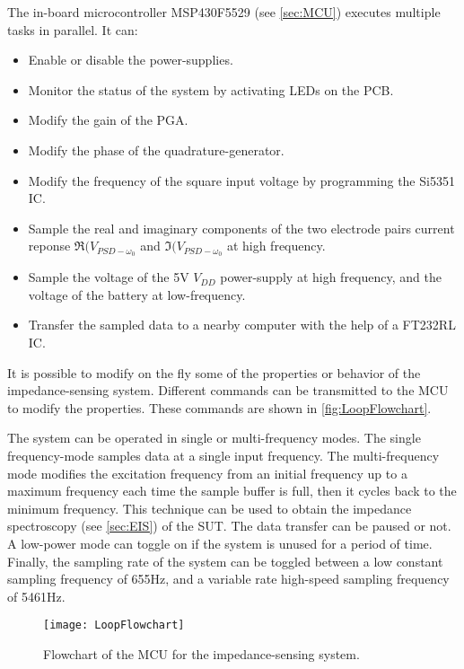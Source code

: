 The in-board microcontroller MSP430F5529 (see \autoref{sec:MCU}) executes multiple tasks in parallel. It can:
\begin{itemize}
    \item Enable or disable the power-supplies. 
    \item Monitor the status of the system by activating LEDs on the PCB. 
    \item Modify the gain of the PGA.
    \item Modify the phase of the quadrature-generator. 
    \item Modify the frequency of the square input voltage by programming the Si5351 IC. 
    \item Sample the real and imaginary components of the two electrode pairs current reponse $\Re(V_{PSD-\omega_0}$ and $\Im(V_{PSD-\omega_0}$ at high frequency. 
    \item Sample the voltage of the 5V $V_{DD}$ power-supply at high frequency, and the voltage of the battery at low-frequency. 
    \item Transfer the sampled data to a nearby computer with the help of a FT232RL IC. 
\end{itemize}

It is possible to modify on the fly some of the properties or behavior of the impedance-sensing system. Different commands can be transmitted to the MCU to modify the properties. These commands are shown in \autoref{fig:LoopFlowchart}. \par

The system can be operated in single or multi-frequency modes. The single frequency-mode samples data at a single input frequency. The multi-frequency mode modifies the excitation frequency from an initial frequency up to a maximum frequency each time the sample buffer is full, then it cycles back to the minimum frequency. This technique can be used to obtain the impedance spectroscopy (see \autoref{sec:EIS}) of the SUT. The data transfer can be paused or not. A low-power mode can toggle on if the system is unused for a period of time. Finally, the sampling rate of the system can be toggled between a low constant sampling frequency of 655Hz, and a variable rate high-speed sampling frequency of 5461Hz. \par
\begin{figure}[h]
    \centering
    \texttt{[image: LoopFlowchart]}
    \caption{Flowchart of the MCU for the impedance-sensing system.}
    \label{fig:LoopFlowchart}
\end{figure}

